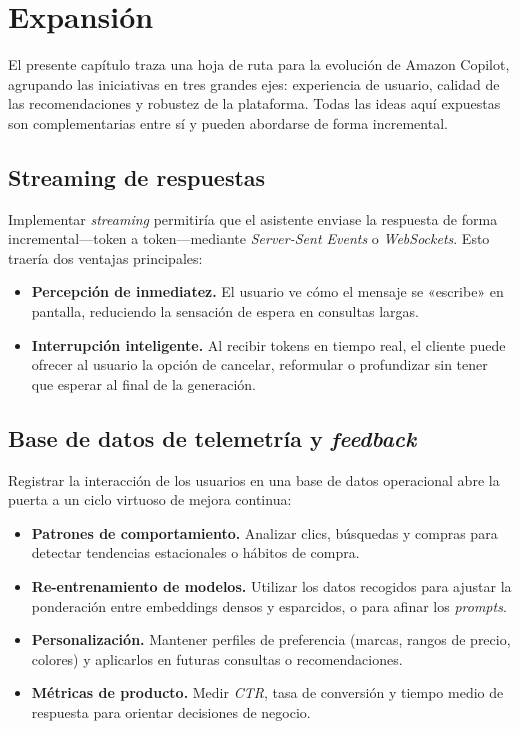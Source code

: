 \section{Expansión}

El presente capítulo traza una hoja de ruta para la evolución de Amazon Copilot, agrupando las iniciativas en tres grandes ejes: experiencia de usuario, calidad de las recomendaciones y robustez de la plataforma. Todas las ideas aquí expuestas son complementarias entre sí y pueden abordarse de forma incremental.

\subsection{Streaming de respuestas}

Implementar \textit{streaming} permitiría que el asistente enviase la respuesta de forma incremental—token a token—mediante \textit{Server-Sent Events} o \textit{WebSockets}.  
Esto traería dos ventajas principales:

\begin{itemize}
    \item \textbf{Percepción de inmediatez.} El usuario ve cómo el mensaje se «escribe» en pantalla, reduciendo la sensación de espera en consultas largas.
    \item \textbf{Interrupción inteligente.} Al recibir tokens en tiempo real, el cliente puede ofrecer al usuario la opción de cancelar, reformular o profundizar sin tener que esperar al final de la generación.
\end{itemize}

\subsection{Base de datos de telemetría y \textit{feedback}}

Registrar la interacción de los usuarios en una base de datos operacional abre la puerta a un ciclo virtuoso de mejora continua:

\begin{itemize}
    \item \textbf{Patrones de comportamiento.} Analizar clics, búsquedas y compras para detectar tendencias estacionales o hábitos de compra.
    \item \textbf{Re-entrenamiento de modelos.} Utilizar los datos recogidos para ajustar la ponderación entre embeddings densos y esparcidos, o para afinar los \emph{prompts}.
    \item \textbf{Personalización.} Mantener perfiles de preferencia (marcas, rangos de precio, colores) y aplicarlos en futuras consultas o recomendaciones.
    \item \textbf{Métricas de producto.} Medir \emph{CTR}, tasa de conversión y tiempo medio de respuesta para orientar decisiones de negocio.
\end{itemize}


